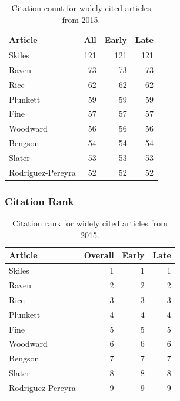 \documentclass[
  10pt,
  letterpaper,
  DIV=11,
  numbers=noendperiod,
  twoside]{scrartcl}
\begin{document}
\begin{longtable}[]{@{}lrrr@{}}

\caption{\label{tbl-citation-count-2015}Citation count for widely cited
articles from 2015.}

\tabularnewline

\toprule\noalign{}
Article & All & Early & Late \\
\midrule\noalign{}
\endhead
\bottomrule\noalign{}
\endlastfoot
Skiles & 121 & 121 & 121 \\
Raven & 73 & 73 & 73 \\
Rice & 62 & 62 & 62 \\
Plunkett & 59 & 59 & 59 \\
Fine & 57 & 57 & 57 \\
Woodward & 56 & 56 & 56 \\
Bengson & 54 & 54 & 54 \\
Slater & 53 & 53 & 53 \\
Rodriguez-Pereyra & 52 & 52 & 52 \\

\end{longtable}

\subsubsection*{Citation Rank}\label{citation-rank-39}

\begin{longtable}[]{@{}lrrr@{}}

\caption{\label{tbl-citation-rank-2015}Citation rank for widely cited
articles from 2015.}

\tabularnewline

\toprule\noalign{}
Article & Overall & Early & Late \\
\midrule\noalign{}
\endhead
\bottomrule\noalign{}
\endlastfoot
Skiles & 1 & 1 & 1 \\
Raven & 2 & 2 & 2 \\
Rice & 3 & 3 & 3 \\
Plunkett & 4 & 4 & 4 \\
Fine & 5 & 5 & 5 \\
Woodward & 6 & 6 & 6 \\
Bengson & 7 & 7 & 7 \\
Slater & 8 & 8 & 8 \\
Rodriguez-Pereyra & 9 & 9 & 9 \\

\end{longtable}
\end{document}
